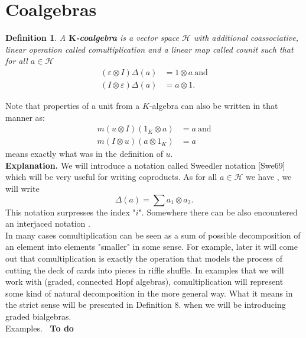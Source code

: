 \documentclass[a4paper, 12pt]{report}
\newtheorem{definition}{Definition}
\newcommand{\smalltodo}[1]{\textbf{\ To do}}
\begin{document}
\section{Coalgebras}
\begin{definition}
A \textbf{$\textbf{K}$-coalgebra} is a vector space $\mathcal{H}$
with additional coassociative, linear operation
 called comultiplication and
a linear map  called counit such that for all
$a \in \mathcal{H}$
\begin{align*}
(\varepsilon \otimes I)\Delta(a) &= 1 \otimes a \mathrm{\ and} \\
(I \otimes \varepsilon)\Delta(a) &= a \otimes 1.
\end{align*}
\end{definition}
Note that properties of a unit from a $K$-algebra can also be written in that manner as:
\begin{align*}
m(u \otimes I)(1_K \otimes a) &= a \mathrm{\ and}\\
m(I \otimes u)(a \otimes 1_K) &= a
\end{align*}
means exactly what was in the definition of $u$. \\[8pt]
\textbf{Explanation.} We will introduce a notation called Sweedler notation [Swe69] which will be
very useful
for writing coproducts. As for all $a \in \mathcal{H}$ we have
, we will write
\begin{equation*}
\Delta(a) = \displaystyle\sum a_1 \otimes a_2.
\end{equation*}
This notation surpresses the index "$i$". Somewhere there can be also encountered an interjaced
notation . \\
In many cases comultiplication can be seen as a sum of possible decomposition of an element into
elements "smaller" in some sense.
For example, later it will come out that comultiplication is exactly the operation that
models the process of cutting the deck of cards into pieces in riffle shuffle. In examples that we will
work with (graded, connected Hopf algebras), comultiplication will represent some kind of natural
decomposition in the more general way. What it means in the strict sense will be presented in
Definition 8. when we will be introducing graded bialgebras. \\
Examples. \smalltodo{}  \\[8pt]
\end{document}
